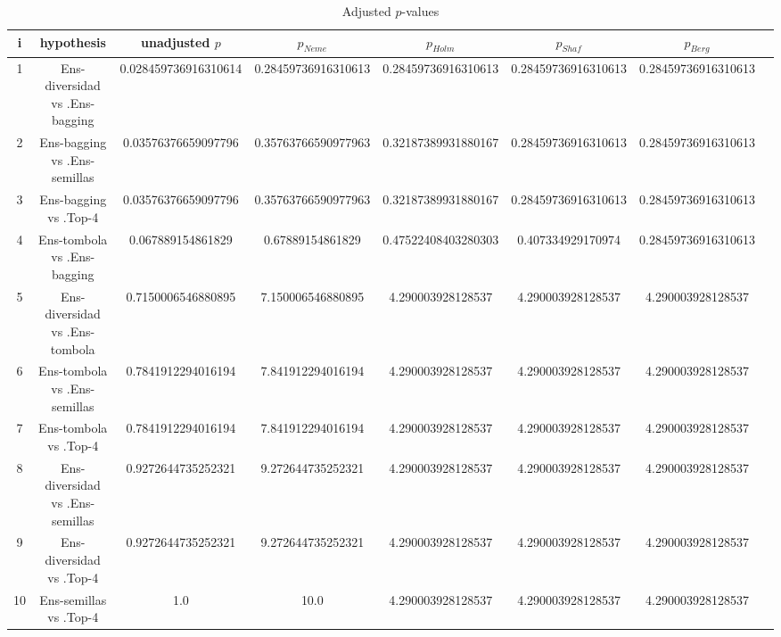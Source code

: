 \documentclass[a4paper,10pt]{article}
\begin{document}
\begin{landscape}
\begin{table}[!htp]
\centering\tiny
\caption{Adjusted $p$-values}
\begin{tabular}{cccccccc}
i&hypothesis&unadjusted $p$&$p_{Neme}$&$p_{Holm}$&$p_{Shaf}$&$p_{Berg}$\\
\hline
1&Ens-diversidad vs .Ens-bagging&0.028459736916310614&0.28459736916310613&0.28459736916310613&0.28459736916310613&0.28459736916310613\\
2&Ens-bagging vs .Ens-semillas&0.03576376659097796&0.35763766590977963&0.32187389931880167&0.28459736916310613&0.28459736916310613\\
3&Ens-bagging vs .Top-4&0.03576376659097796&0.35763766590977963&0.32187389931880167&0.28459736916310613&0.28459736916310613\\
4&Ens-tombola vs .Ens-bagging&0.067889154861829&0.67889154861829&0.47522408403280303&0.407334929170974&0.28459736916310613\\
5&Ens-diversidad vs .Ens-tombola&0.7150006546880895&7.150006546880895&4.290003928128537&4.290003928128537&4.290003928128537\\
6&Ens-tombola vs .Ens-semillas&0.7841912294016194&7.841912294016194&4.290003928128537&4.290003928128537&4.290003928128537\\
7&Ens-tombola vs .Top-4&0.7841912294016194&7.841912294016194&4.290003928128537&4.290003928128537&4.290003928128537\\
8&Ens-diversidad vs .Ens-semillas&0.9272644735252321&9.272644735252321&4.290003928128537&4.290003928128537&4.290003928128537\\
9&Ens-diversidad vs .Top-4&0.9272644735252321&9.272644735252321&4.290003928128537&4.290003928128537&4.290003928128537\\
10&Ens-semillas vs .Top-4&1.0&10.0&4.290003928128537&4.290003928128537&4.290003928128537\\
\hline
\end{tabular}
\end{table}

\end{landscape}
\end{document}
